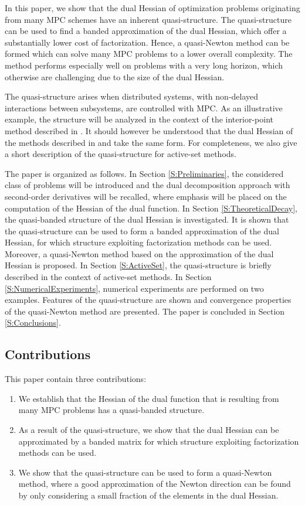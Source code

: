 In this paper, we show that the dual Hessian of optimization problems originating from many MPC schemes have an inherent quasi-structure. The quasi-structure can be used to find a banded approximation of the dual Hessian, which offer a substantially lower cost of factorization. Hence, a quasi-Newton method can be formed which can solve many MPC problems to a lower overall complexity. The method performs especially well on problems with a very long horizon, which otherwise are challenging due to the size of the dual Hessian.

The quasi-structure arises when distributed systems, with non-delayed interactions between subsystems, are controlled with MPC. As an illustrative example, the structure will be analyzed in the context of the interior-point method described in \cite{Necoara2009a}. It should however be understood that the dual Hessian of the methods described in \cite{Quoc2013} and \cite{Klintberg2014} take the same form. For completeness, we also give a short description of the quasi-structure for active-set methods.

The paper is organized as follows. In Section \ref{S:Preliminaries}, the considered class of problems will be introduced and the dual decomposition approach with second-order derivatives will be recalled, where emphasis will be placed on the computation of the Hessian of the dual function. In Section \ref{S:TheoreticalDecay}, the quasi-banded structure of the dual Hessian is investigated. It is shown that the quasi-structure can be used to form a banded approximation of the dual Hessian, for which structure exploiting factorization methods can be used. Moreover, a quasi-Newton method based on the approximation of the dual Hessian is proposed. In Section \ref{S:ActiveSet}, the quasi-structure is briefly described in the context of active-set methods. In Section \ref{S:NumericalExperiments}, numerical experiments are performed on two examples. Features of the quasi-structure are shown and convergence properties of the quasi-Newton method are presented. The paper is concluded in Section \ref{S:Conclusions}.

\subsection{Contributions} This paper contain three contributions:
\begin{enumerate}
\item We establish that the Hessian of the dual function that is resulting from many MPC problems has a quasi-banded structure.
\item As a result of the quasi-structure, we show that the dual Hessian can be approximated by a banded matrix for which structure exploiting factorization methods can be used.
\item We show that the quasi-structure can be used to form a quasi-Newton method, where a good approximation of the Newton direction can be found by only considering a small fraction of the elements in the dual Hessian.
\end{enumerate}

